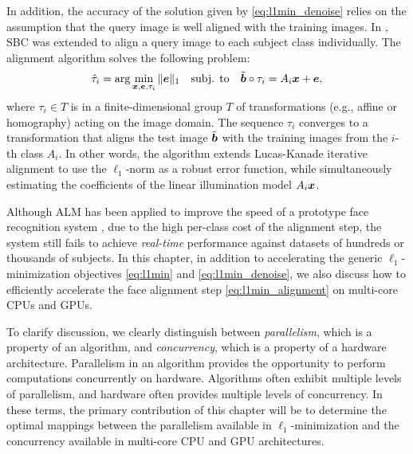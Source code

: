In addition, the accuracy of the solution given by \eqref{eq:l1min_denoise} relies on the assumption
that the query image is well aligned with the training images.
In \cite{WagnerA2009-CVPR}, SBC was extended to align
a query image to each subject class individually. The alignment algorithm solves
the following problem:
\begin{equation}
\hat{\tau}_i = \arg\min_{{\boldsymbol{x}}, {\boldsymbol{e}}, \tau_i} \|{\boldsymbol{e}}\|_1\quad \mbox{subj. to}\quad \tilde{\boldsymbol{b}}\circ\tau_i = A_i{\boldsymbol{x}} + {\boldsymbol{e}},
\label{eq:l1min_alignment}
\end{equation}
where $\tau_i\in T$ is in a finite-dimensional group $T$ of transformations
(e.g., affine or homography) acting on the image domain.  The sequence
$\tau_i$ converges to a transformation that aligns the test image $\tilde{\boldsymbol{b}}$
with the training images from the $i$-th class $A_i$. In other words, the algorithm 
extends Lucas-Kanade iterative alignment \cite{LucasB1981} to use the
$\ell_1$-norm as a robust error function, while simultaneously estimating
the coefficients of the linear illumination model $A_i{\boldsymbol{x}}$.  

Although ALM has been applied to improve the speed of a prototype face recognition system \cite{WagnerA2011-PAMI},
due to the high per-class cost
of the alignment step, the system still fails to achieve \emph{real-time}
performance against datasets of hundreds or thousands of subjects.  In this chapter,
in addition to accelerating the generic
$\ell_1$-minimization objectives \eqref{eq:l1min} and \eqref{eq:l1min_denoise}, we 
also discuss how to efficiently accelerate the face alignment step
\eqref{eq:l1min_alignment} on multi-core CPUs and GPUs.

To clarify discussion, we clearly distinguish between {\em parallelism},
which is a property of an algorithm, and {\em concurrency}, which is a
property of a hardware architecture. Parallelism in an algorithm provides the
opportunity to perform computations concurrently on hardware.  Algorithms often
exhibit multiple levels of parallelism, and hardware often provides multiple
levels of concurrency.  In these terms, the primary contribution of this chapter
will be to determine the optimal mappings between the parallelism available in
$\ell_1$-minimization and the concurrency available in multi-core CPU and GPU
architectures.

